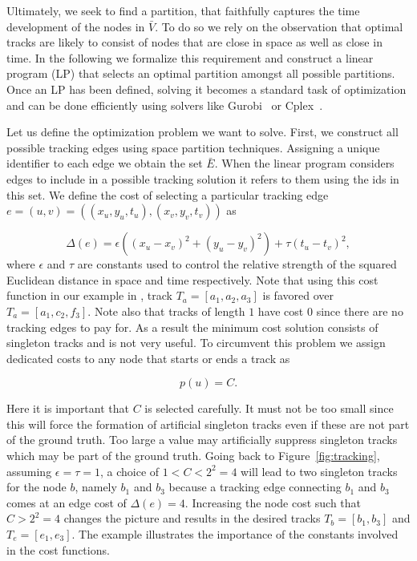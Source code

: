 	      Ultimately, we seek to find a partition, that faithfully captures the time development of the nodes in $\bar{V}$. To do so we rely on the observation that optimal tracks are likely to consist of nodes that are close in space as well as close in time. In the following we formalize this requirement and construct a linear program (LP) that selects an optimal partition amongst all possible partitions. Once an LP has been defined, solving it becomes a standard task of optimization and can be done efficiently using solvers like Gurobi~\cite{optimization2012gurobi} or Cplex~\cite{cplex2005high}.

	     Let us define the optimization problem we want to solve. First, we construct all possible tracking edges using space partition techniques. Assigning a unique identifier to each edge we obtain the set $\bar{E}$. When the linear program considers edges to include in a possible tracking solution it refers to them using the ids in this set. We define the cost of selecting a particular tracking edge $e = (u,v) = ((x_u,y_u,t_u), (x_v,y_v,t_v))$ as
	      
	      \begin{equation}
	        \Delta(e) = \epsilon ((x_u - x_v)^2 + (y_u - y_v)^2 ) + \tau (t_u - t_v)^2,
	      \end{equation}
	      where $\epsilon$ and $\tau$ are constants used to control the relative strength of the squared Euclidean distance in space and time respectively. Note that using this cost function in our example in , track $T_a = [a_1,a_2,a_3]$ is favored over $T_a = [a_1,c_2,f_3]$. Note also that tracks of length $1$ have cost $0$ since there are no tracking edges to pay for. As a result the minimum cost solution consists of singleton tracks and is not very useful. To circumvent this problem we assign dedicated costs to any node that starts or ends a track as

	      \begin{equation}
	        p(u) = C.
	      \end{equation}

	      Here it is important that $C$ is selected carefully. It must not be too small since this will force the formation of artificial singleton tracks even if these are not part of the ground truth. Too large a value may artificially suppress singleton tracks which may be part of the ground truth. Going back to Figure~\ref{fig:tracking}, assuming $\epsilon = \tau = 1$, a choice of $ 1 < C < 2^2 = 4$ will lead to two singleton tracks for the node $b$, namely ${b_1}$ and ${b_3}$ because a tracking edge connecting $b_1$ and $b_3$ comes at an edge cost of $\Delta(e)=4$. Increasing the node cost such that $C>2^2 = 4$ changes the picture and results in the desired tracks $T_b = [b_1, b_3]$ and $T_e = [e_1, e_3]$. The example illustrates the importance of the constants involved in the cost functions.

